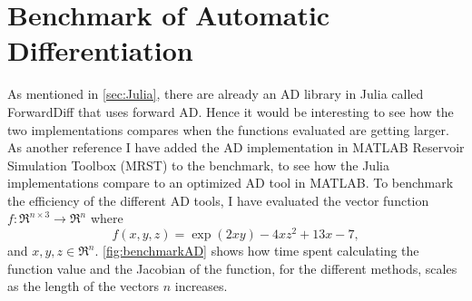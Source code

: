 \section{Benchmark of Automatic Differentiation}
As mentioned in \autoref{sec:Julia}, there are already an AD library in Julia called ForwardDiff \emph{\citep{ForwardDiff}} that uses forward AD. Hence it would be interesting to see how the two implementations compares when the functions evaluated are getting larger. As another reference I have added the AD implementation in MATLAB Reservoir Simulation Toolbox (MRST) \emph{\cite{mrstHomepage}} to the benchmark, to see how the Julia implementations compare to an optimized AD tool in MATLAB. To benchmark the efficiency of the different AD tools, I have evaluated the vector function $f: \Re^{n\times 3} \rightarrow \Re^n $ where
\begin{equation}
\label{eq:benchmarkFunction}
f(x,y,z)  = \exp(2xy) - 4xz^2 + 13x - 7,
\end{equation}
and $x,y,z \in \Re^n$. \autoref{fig:benchmarkAD} shows how time spent calculating the function value and the Jacobian of the function, for the different methods, scales as the length of the vectors $n$ increases.
